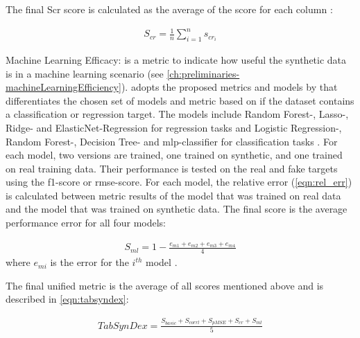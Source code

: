 \begin{description}
The final Scr score is calculated as the average of the score for each column \cite{chundawat2022UniversalMetricRobust}:

\begin{equation}
  \begin{align*}
    \label{eqn:s_cr}
    S_{cr} = \frac{1}{n} \sum_{i=1}^{n} s_{cr_i}
    \end{align*}
\end{equation}



  \item Machine Learning Efficacy:
  is a metric to indicate how useful the synthetic data is in a machine learning scenario (see \autoref{ch:preliminaries-machineLearningEfficiency}).
  \cite{chundawat2022UniversalMetricRobust} adopts the proposed metrics and models by \cite{brenninkmeijer2019GenerationEvaluationTabular} that differentiates the chosen set of models and metric based on
  if the dataset contains a classification or regression target.
  The models include Random Forest-, Lasso-, Ridge- and ElasticNet-Regression for regression tasks and Logistic Regression-, Random Forest-,  Decision Tree- and \gls{mlp}-classifier for classification tasks \cite{brenninkmeijer2019GenerationEvaluationTabular, chundawat2022UniversalMetricRobust}.
  For each model, two versions are trained, one trained on synthetic, and one trained on real training data.
  Their performance is tested on the real and fake targets using the f1-score or \gls{rmse}-score.
  For each model, the relative error (\autoref{eqn:rel_err}) is calculated between metric results of the model that was trained on real data and the model that was trained on synthetic data.
  The final score is the average performance error for all four models:

  \begin{equation}
    \begin{align*}
      \label{eqn:s_ml}
      S_{ml} = 1-\frac{e_{m1}+e_{m2}+e_{m3}+e_{m4}}{4}
      \end{align*}
  \end{equation}
  where $e_{mi}$ is the error for the $i^{th}$ model \cite{chundawat2022UniversalMetricRobust}.
\end{description}

The final unified metric is the average of all scores mentioned above and is described in \autoref{eqn:tabsyndex}\cite{chundawat2022UniversalMetricRobust}:

\begin{equation}
  \begin{align*}
    \label{eqn:tabsyndex}
    TabSynDex = \frac{S_{basic}+S_{corrl}+S_{pMSE}+S_{cr}+S_{ml}}{5}
    \end{align*}
\end{equation}
